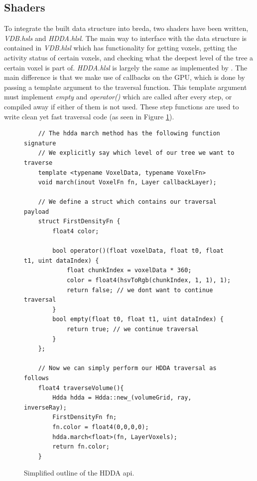 \subsection{Shaders} \label{implementation:shaders}
To integrate the built data structure into breda, two shaders have been written, \textit{VDB.hsls} and \textit{HDDA.hlsl}. The main way to interface with the data structure is contained in \textit{VDB.hlsl} which has functionality for getting voxels, getting the activity status of certain voxels, and checking what the deepest level of the tree a certain voxel is part of. \textit{HDDA.hlsl} is largely the same as implemented by \cite{museth2013vdb}. The main difference is that we make use of callbacks on the GPU, which is done by passing a template argument to the traversal function. This template argument must implement \textit{empty} and \textit{operator()} which are called after every step, or compiled away if either of them is not used. These step functions are used to write clean yet fast traversal code (as seen in Figure \ref{implementation:hdda_sample}).


\begin{figure}
    \begin{lstlisting}
    // The hdda march method has the following function signature
    // We explicitly say which level of our tree we want to traverse
    template <typename VoxelData, typename VoxelFn>
    void march(inout VoxelFn fn, Layer callbackLayer);

    // We define a struct which contains our traversal payload
    struct FirstDensityFn {
        float4 color;
    
        bool operator()(float voxelData, float t0, float t1, uint dataIndex) {
            float chunkIndex = voxelData * 360;
            color = float4(hsvToRgb(chunkIndex, 1, 1), 1);
            return false; // we dont want to continue traversal
        }
        bool empty(float t0, float t1, uint dataIndex) { 
            return true; // we continue traversal
        }
    };

    // Now we can simply perform our HDDA traversal as follows
    float4 traverseVolume(){
        Hdda hdda = Hdda::new_(volumeGrid, ray, inverseRay);
        FirstDensityFn fn;
        fn.color = float4(0,0,0,0);
        hdda.march<float>(fn, LayerVoxels); 
        return fn.color;
    }
\end{lstlisting}
    \caption{Simplified outline of the HDDA api.}\label{implementation:hdda_sample}
\end{figure}


